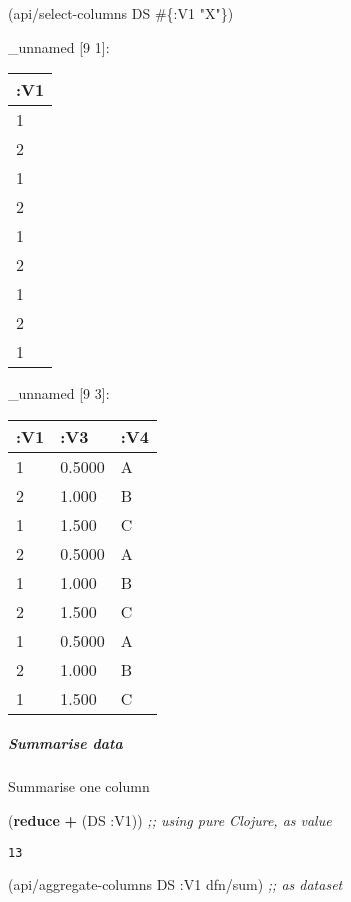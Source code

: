 \documentclass[]{article}
\newenvironment{Shaded}{\begin{snugshade}}{\end{snugshade}}
\newcommand{\KeywordTok}[1]{\textcolor[rgb]{0.13,0.29,0.53}{\textbf{#1}}}
\newcommand{\StringTok}[1]{\textcolor[rgb]{0.31,0.60,0.02}{#1}}
\newcommand{\CommentTok}[1]{\textcolor[rgb]{0.56,0.35,0.01}{\textit{#1}}}
\newcommand{\VariableTok}[1]{\textcolor[rgb]{0.00,0.00,0.00}{#1}}
\newcommand{\AttributeTok}[1]{\textcolor[rgb]{0.77,0.63,0.00}{#1}}
\newcommand{\NormalTok}[1]{#1}
\let\oldsubparagraph\subparagraph
\renewcommand{\subparagraph}[1]{\oldsubparagraph{#1}\mbox{}}
\begin{document}
\begin{Shaded}
\begin{Highlighting}[]
\NormalTok{(api/select-columns DS #\{}\AttributeTok{:V1} \StringTok{"X"}\NormalTok{\})}
\end{Highlighting}
\end{Shaded}

\_unnamed {[}9 1{]}:

\begin{longtable}[]{@{}l@{}}
\toprule
:V1\tabularnewline
\midrule
\endhead
1\tabularnewline
2\tabularnewline
1\tabularnewline
2\tabularnewline
1\tabularnewline
2\tabularnewline
1\tabularnewline
2\tabularnewline
1\tabularnewline
\bottomrule
\end{longtable}

\begin{Shaded}
\end{Shaded}

\_unnamed {[}9 3{]}:

\begin{longtable}[]{@{}lll@{}}
\toprule
:V1 & :V3 & :V4\tabularnewline
\midrule
\endhead
1 & 0.5000 & A\tabularnewline
2 & 1.000 & B\tabularnewline
1 & 1.500 & C\tabularnewline
2 & 0.5000 & A\tabularnewline
1 & 1.000 & B\tabularnewline
2 & 1.500 & C\tabularnewline
1 & 0.5000 & A\tabularnewline
2 & 1.000 & B\tabularnewline
1 & 1.500 & C\tabularnewline
\bottomrule
\end{longtable}

\subparagraph{Summarise data}\label{summarise-data}

Summarise one column

\begin{Shaded}
\begin{Highlighting}[]
\NormalTok{(}\KeywordTok{reduce} \KeywordTok{+}\NormalTok{ (DS }\AttributeTok{:V1}\NormalTok{)) }\CommentTok{;; using pure Clojure, as value}
\end{Highlighting}
\end{Shaded}

\begin{verbatim}
13
\end{verbatim}

\begin{Shaded}
\begin{Highlighting}[]
\NormalTok{(api/aggregate-columns DS }\AttributeTok{:V1}\NormalTok{ dfn/sum) }\CommentTok{;; as dataset}
\end{Highlighting}
\end{Shaded}
\end{document}
